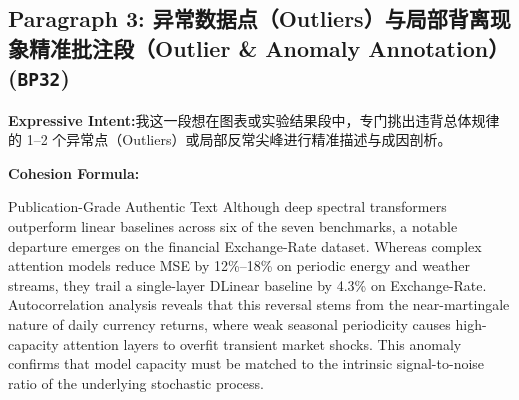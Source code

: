 \subsection*{Paragraph 3: 异常数据点（Outliers）与局部背离现象精准批注段（Outlier \& Anomaly Annotation） (\texttt{BP32})}
\noindent\textbf{Expressive Intent:}\enspace 我这一段想在图表或实验结果段中，专门挑出违背总体规律的 1--2 个异常点（Outliers）或局部反常尖峰进行精准描述与成因剖析。\par
\noindent\textbf{Cohesion Formula:}\par\vspace{4pt}
\begin{ExampleBox}{Publication-Grade Authentic Text}
Although deep spectral transformers outperform linear baselines across six of the seven benchmarks, a notable departure emerges on the financial Exchange-Rate dataset. Whereas complex attention models reduce MSE by 12\%--18\% on periodic energy and weather streams, they trail a single-layer DLinear baseline by 4.3\% on Exchange-Rate. Autocorrelation analysis reveals that this reversal stems from the near-martingale nature of daily currency returns, where weak seasonal periodicity causes high-capacity attention layers to overfit transient market shocks. This anomaly confirms that model capacity must be matched to the intrinsic signal-to-noise ratio of the underlying stochastic process.
\end{ExampleBox}
